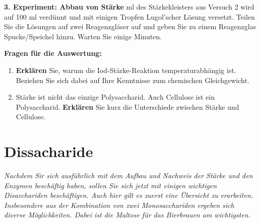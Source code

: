\documentclass{scrartcl}  %
\begin{document}
\begin{tcolorbox}
				\textbf{3. Experiment: Abbau von Stärke}  ml des Stärkekleisters aus Versuch 2 wird auf 100 ml verdünnt und mit einigen Tropfen Lugol’scher Lösung versetzt. Teilen Sie die Lösungen auf zwei Reagenzgläser auf und geben Sie zu einem Reagenzglas Spucke/Speichel hinzu. Warten Sie einige Minuten.
			\end{tcolorbox}	
			
\vspace{0.3cm}
			\noindent \textbf{Fragen für die Auswertung:}
			\begin{enumerate}
				\item \textbf{Erklären} Sie, warum die Iod-Stärke-Reaktion temperaturabhängig ist. Beziehen Sie sich dabei auf Ihre Kenntnisse zum chemischen Gleichgewicht.
				\item Stärke ist nicht das einzige Polysaccharid. Auch Cellulose ist ein Polysaccharid. \textbf{Erklären} Sie kurz die Unterschiede zwischen Stärke und Cellulose. 
			\end{enumerate}
			
\newpage
	\section{Dissacharide}
	
		\textit{Nachdem Sir sich ausführlich mit dem Aufbau und Nachweis der Stärke und den Enzymen beschäftig haben, sollen Sie sich jetzt mit einigen wichtigen Disacchariden beschäftigen. Auch hier gilt es zuerst eine Übersicht zu erarbeiten. Insbesondere aus der Kombination von zwei Monosacchariden ergeben sich diverse Möglichkeiten. Dabei ist die Maltose für das Bierbrauen am wichtigsten.} \newline
	
\end{document}
